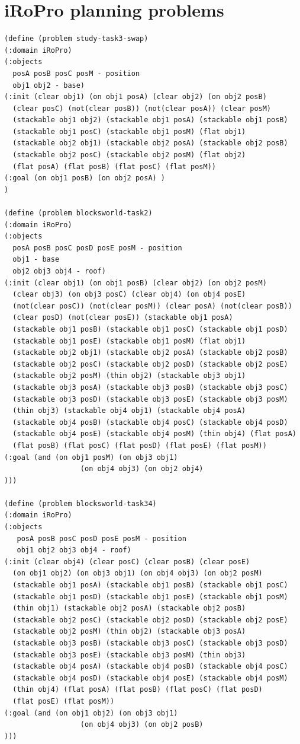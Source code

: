 \section{iRoPro planning problems}
\begin{verbatim}
(define (problem study-task3-swap)
(:domain iRoPro)
(:objects 
  posA posB posC posM - position
  obj1 obj2 - base)
(:init (clear obj1) (on obj1 posA) (clear obj2) (on obj2 posB) 
  (clear posC) (not(clear posB)) (not(clear posA)) (clear posM) 
  (stackable obj1 obj2) (stackable obj1 posA) (stackable obj1 posB) 
  (stackable obj1 posC) (stackable obj1 posM) (flat obj1) 
  (stackable obj2 obj1) (stackable obj2 posA) (stackable obj2 posB) 
  (stackable obj2 posC) (stackable obj2 posM) (flat obj2) 
  (flat posA) (flat posB) (flat posC) (flat posM))
(:goal (on obj1 posB) (on obj2 posA) )
)

(define (problem blocksworld-task2)
(:domain iRoPro)
(:objects 
  posA posB posC posD posE posM - position
  obj1 - base
  obj2 obj3 obj4 - roof)
(:init (clear obj1) (on obj1 posB) (clear obj2) (on obj2 posM) 
  (clear obj3) (on obj3 posC) (clear obj4) (on obj4 posE) 
  (not(clear posC)) (not(clear posM)) (clear posA) (not(clear posB))
  (clear posD) (not(clear posE)) (stackable obj1 posA) 
  (stackable obj1 posB) (stackable obj1 posC) (stackable obj1 posD) 
  (stackable obj1 posE) (stackable obj1 posM) (flat obj1) 
  (stackable obj2 obj1) (stackable obj2 posA) (stackable obj2 posB) 
  (stackable obj2 posC) (stackable obj2 posD) (stackable obj2 posE) 
  (stackable obj2 posM) (thin obj2) (stackable obj3 obj1) 
  (stackable obj3 posA) (stackable obj3 posB) (stackable obj3 posC) 
  (stackable obj3 posD) (stackable obj3 posE) (stackable obj3 posM) 
  (thin obj3) (stackable obj4 obj1) (stackable obj4 posA) 
  (stackable obj4 posB) (stackable obj4 posC) (stackable obj4 posD) 
  (stackable obj4 posE) (stackable obj4 posM) (thin obj4) (flat posA) 
  (flat posB) (flat posC) (flat posD) (flat posE) (flat posM))
(:goal (and (on obj1 posM) (on obj3 obj1) 
                  (on obj4 obj3) (on obj2 obj4) 
)))

(define (problem blocksworld-task34)
(:domain iRoPro)
(:objects 
   posA posB posC posD posE posM - position
   obj1 obj2 obj3 obj4 - roof)
(:init (clear obj4) (clear posC) (clear posB) (clear posE) 
  (on obj1 obj2) (on obj3 obj1) (on obj4 obj3) (on obj2 posM) 
  (stackable obj1 posA) (stackable obj1 posB) (stackable obj1 posC) 
  (stackable obj1 posD) (stackable obj1 posE) (stackable obj1 posM) 
  (thin obj1) (stackable obj2 posA) (stackable obj2 posB) 
  (stackable obj2 posC) (stackable obj2 posD) (stackable obj2 posE) 
  (stackable obj2 posM) (thin obj2) (stackable obj3 posA) 
  (stackable obj3 posB) (stackable obj3 posC) (stackable obj3 posD) 
  (stackable obj3 posE) (stackable obj3 posM) (thin obj3) 
  (stackable obj4 posA) (stackable obj4 posB) (stackable obj4 posC) 
  (stackable obj4 posD) (stackable obj4 posE) (stackable obj4 posM) 
  (thin obj4) (flat posA) (flat posB) (flat posC) (flat posD) 
  (flat posE) (flat posM))
(:goal (and (on obj1 obj2) (on obj3 obj1) 
                  (on obj4 obj3) (on obj2 posB) 
)))

\end{verbatim}
